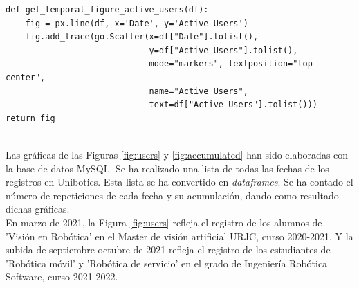 \begin{lstlisting}
def get_temporal_figure_active_users(df):
    fig = px.line(df, x='Date', y='Active Users')
    fig.add_trace(go.Scatter(x=df["Date"].tolist(), 
                             y=df["Active Users"].tolist(),
                             mode="markers", textposition="top center", 
                             name="Active Users",
                             text=df["Active Users"].tolist()))
return fig
\end{lstlisting}
\\

Las gráficas de las Figuras \ref{fig:users} y \ref{fig:accumulated} han sido elaboradas con la base de datos MySQL. Se ha realizado una lista de todas las fechas de los registros en Unibotics. Esta lista se ha convertido en \textit{dataframes}. Se ha contado el número de repeticiones de cada fecha y su acumulación, dando como resultado dichas gráficas.\\
\newpage
En marzo de 2021, la Figura \ref{fig:users} refleja el registro de los alumnos de 'Visión en Robótica' en el Master de visión artificial URJC, curso 2020-2021. Y la subida de septiembre-octubre de 2021 refleja el registro de los estudiantes de 'Robótica móvil' y 'Robótica de servicio' en el grado de Ingeniería Robótica Software, curso 2021-2022.



